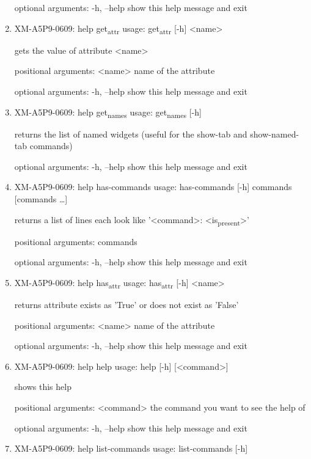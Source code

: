 \documentclass[11pt]{article}
\begin{document}
\begin{enumerate}
optional arguments:
  -h, --help  show this help message and exit

\item XM-A5P9-0609: help get\textsubscript{attr}
\label{sec:orgb9cb7a7}
usage: get\textsubscript{attr} [-h] <name>

gets the value of attribute <name>

positional arguments:
  <name>      name of the attribute

optional arguments:
  -h, --help  show this help message and exit

\item XM-A5P9-0609: help get\textsubscript{names}
\label{sec:org560d752}
usage: get\textsubscript{names} [-h]

returns the list of named widgets (useful for the show-tab and show-named-tab
commands)

optional arguments:
  -h, --help  show this help message and exit

\item XM-A5P9-0609: help has-commands
\label{sec:org7f2ca45}
usage: has-commands [-h] commands [commands \ldots{}]

returns a list of lines each look like '<command>: <is\textsubscript{present}>'

positional arguments:
  commands

optional arguments:
  -h, --help  show this help message and exit

\item XM-A5P9-0609: help has\textsubscript{attr}
\label{sec:org9ec15e7}
usage: has\textsubscript{attr} [-h] <name>

returns attribute exists as 'True' or does not exist as 'False'

positional arguments:
  <name>      name of the attribute

optional arguments:
  -h, --help  show this help message and exit

\item XM-A5P9-0609: help help
\label{sec:orgf8e2680}
usage: help [-h] [<command>]

shows this help

positional arguments:
  <command>   the command you want to see the help of

optional arguments:
  -h, --help  show this help message and exit

\item XM-A5P9-0609: help list-commands
\label{sec:org2537175}
usage: list-commands [-h]


\end{enumerate}
\end{document}
